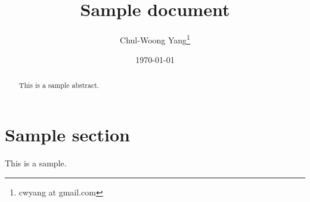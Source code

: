 \documentclass[11pt]{article}
\begin{document}
\title{Sample document}
\author{Chul-Woong Yang\thanks{cwyang at gmail.com}}
\date{\today}

\maketitle

\begin{abstract}
This is a sample abstract.
\end{abstract}

\section{Sample section}
This is a sample\cite{Yang09Cache,Yang09Forest, Yang09Hash}.



\end{document}
